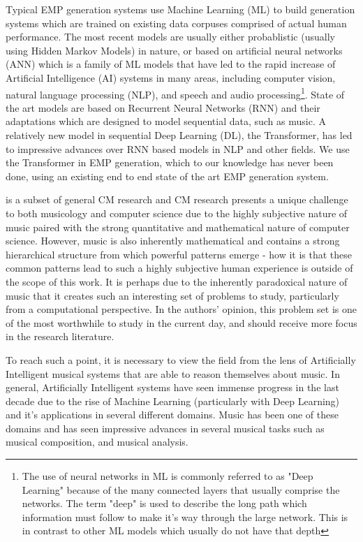 Typical EMP generation systems use Machine Learning (ML) to build generation systems which are trained on existing data corpuses comprised of actual human performance. The most recent models are usually either probablistic (usually using Hidden Markov Models) in nature, or based on artificial neural networks (ANN) which is a family of ML models that have led to the rapid increase of Artificial Intelligence (AI) systems in many areas, including computer vision, natural language processing (NLP), and speech and audio processing\cite{goodfellow2016deep}\footnote{The use of neural networks in ML is commonly referred to as "Deep Learning" because of the many connected layers that usually comprise the networks. The term "deep" is used to describe the long path which information must follow to make it's way through the large network. This is in contrast to other ML models which usually do not have that depth}. State of the art models are based on Recurrent Neural Networks (RNN) and their adaptations which are designed to model sequential data, such as music. A relatively new model in sequential Deep Learning (DL), the Transformer, has led to impressive advances over RNN based models in NLP and other fields. We use the Transformer in EMP generation, which to our knowledge has never been done, using an existing end to end state of the art EMP generation system. 

is a subset of general CM research and CM research presents a unique challenge to both musicology and computer science due to the highly subjective nature of music paired with the strong quantitative and mathematical nature of computer science. However, music is also inherently mathematical and contains a strong hierarchical structure from which powerful patterns emerge - how it is that these common patterns lead to such a highly subjective human experience is outside of the scope of this work. It is perhaps due to the inherently paradoxical nature of music that it creates such an interesting set of problems to study, particularly from a computational perspective. In the authors' opinion, this problem set is one of the most worthwhile to study in the current day, and should receive more focus in the research literature. 

To reach such a point, it is necessary to view the field from the lens of Artificially Intelligent musical systems that are able to reason themselves about music. In general, Artificially Intelligent systems have seen immense progress in the last decade due to the rise of Machine Learning (particularly with Deep Learning) and it's applications in several different domains. Music has been one of these domains and has seen impressive advances in several musical tasks such as musical composition\cite{huang2018music}, and musical analysis\cite{widmer2016getting}. 


